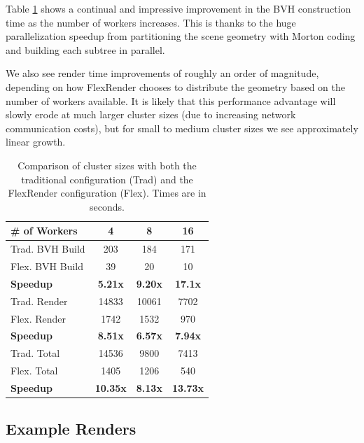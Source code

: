 \documentclass[a4paper,twoside]{article}
\begin{document}
Table \ref{tb:clustersize} shows a continual and impressive improvement in the
BVH construction time as the number of workers increases. This is thanks to the
huge parallelization speedup from partitioning the scene geometry with Morton
coding and building each subtree in parallel.

We also see render time improvements of roughly an order of magnitude, depending
on how FlexRender chooses to distribute the geometry based on the number of
workers available. It is likely that this performance advantage will slowly
erode at much larger cluster sizes (due to increasing network communication
costs), but for small to medium cluster sizes we see approximately linear growth.

\begin{table}
\begin{center}
\begin{tabular}{|l||c|c|c|}
    \hline
    \# of Workers & 4 & 8 & 16 \\
    \hline
    \hline
    Trad. BVH Build & 203 & 184 & 171 \\
    \hline
    Flex. BVH Build & 39 & 20 & 10 \\
    \hline
    \textbf{Speedup} & \textbf{5.21x} & \textbf{9.20x} & \textbf{17.1x} \\
    \hline
    \hline
    Trad. Render & 14833 & 10061 & 7702 \\
    \hline
    Flex. Render & 1742 & 1532  & 970 \\
    \hline
    \textbf{Speedup} & \textbf{8.51x} & \textbf{6.57x} & \textbf{7.94x} \\
    \hline
    \hline
    Trad. Total & 14536 & 9800 & 7413 \\
    \hline
    Flex. Total & 1405 & 1206 & 540 \\
    \hline
    \textbf{Speedup} & \textbf{10.35x} & \textbf{8.13x} & \textbf{13.73x} \\
    \hline
\end{tabular}
\caption{Comparison of cluster sizes with both the traditional configuration (Trad) and the FlexRender configuration (Flex). Times are in seconds.}
\label{tb:clustersize}
\end{center}
\end{table}

\subsection{Example Renders}
\label{examplerenders}
\end{document}
